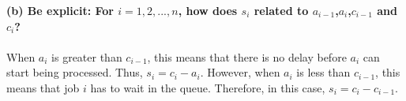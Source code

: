 \textbf{\noindent(b) Be explicit: For $i = 1,2,...,n$, how does $s_i$ related to $a_{i-1}$,$a_i$,$c_{i-1}$ and $c_i$?\\\\}
When $a_i$ is greater than $c_{i-1}$, this means that there is no delay before $a_i$ can start being processed. Thus, $s_i = c_i - a_i$. However, when $a_i$ is less than $c_{i-1}$, this means that job $i$ has to wait in the queue. Therefore, in this case, $s_i = c_i - c_{i-1}$. \\\\